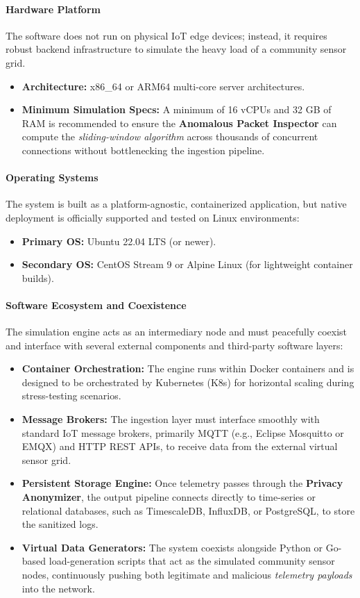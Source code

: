 \documentclass[12pt,letterpaper]{article}
\begin{document}
\paragraph{Hardware Platform}
The software does not run on physical IoT edge devices; instead, it requires robust backend infrastructure to simulate the heavy load of a community sensor grid.\par
\begin{itemize}
\item \textbf{Architecture:} x86\_64 or ARM64 multi-core server architectures.
\item \textbf{Minimum Simulation Specs:} A minimum of 16 vCPUs and 32 GB of RAM is recommended to ensure the \textbf{Anomalous Packet Inspector} can compute the \emph{sliding-window algorithm} across thousands of concurrent connections without bottlenecking the ingestion pipeline.
\end{itemize}
\paragraph{Operating Systems}
The system is built as a platform-agnostic, containerized application, but native deployment is officially supported and tested on Linux environments:\par
\begin{itemize}
\item \textbf{Primary OS:} Ubuntu 22.04 LTS (or newer).
\item \textbf{Secondary OS:} CentOS Stream 9 or Alpine Linux (for lightweight container builds).
\end{itemize}
\paragraph{Software Ecosystem and Coexistence}
The simulation engine acts as an intermediary node and must peacefully coexist and interface with several external components and third-party software layers:\par
\begin{itemize}
\item \textbf{Container Orchestration:} The engine runs within Docker containers and is designed to be orchestrated by Kubernetes (K8s) for horizontal scaling during stress-testing scenarios.
\item \textbf{Message Brokers:} The ingestion layer must interface smoothly with standard IoT message brokers, primarily MQTT (e.g., Eclipse Mosquitto or EMQX) and HTTP REST APIs, to receive data from the external virtual sensor grid.
\item \textbf{Persistent Storage Engine:} Once telemetry passes through the \textbf{Privacy Anonymizer}, the output pipeline connects directly to time-series or relational databases, such as TimescaleDB, InfluxDB, or PostgreSQL, to store the sanitized logs.
\item \textbf{Virtual Data Generators:} The system coexists alongside Python or Go-based load-generation scripts that act as the simulated community sensor nodes, continuously pushing both legitimate and malicious \emph{telemetry payloads} into the network.
\end{itemize}
\vspace{0.08in}
\end{document}
